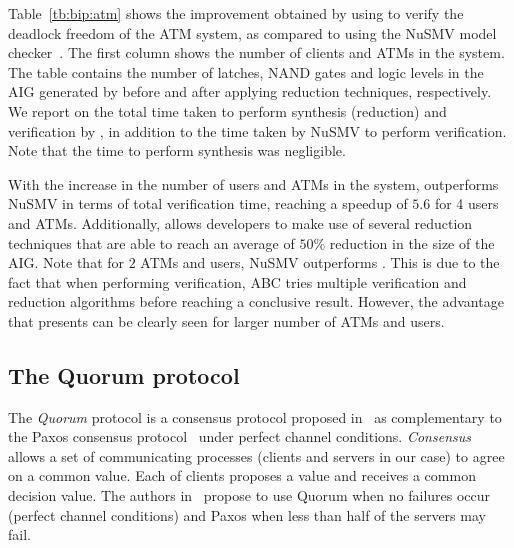 Table~\ref{tb:bip:atm} shows the improvement obtained by using \biptool{}
to verify the deadlock freedom of the ATM system, as compared to using the
NuSMV model checker~\cite{nusmv}.
The first column shows the number of clients and ATMs in the system. 
The table contains the number  of latches, NAND gates and logic levels in the AIG generated by \biptool{} before and after applying reduction techniques, respectively.
We report on the total time taken to perform synthesis (reduction)
and verification by \biptool{}, in addition to the time taken by NuSMV to perform verification.
Note that the time to perform synthesis was negligible. 

With the increase in the number of users and ATMs in the system, \biptool{}  
outperforms NuSMV in terms of total verification time, reaching a speedup 
of $5.6$ for 4 users and ATMs. Additionally, \biptool{} allows developers
to make use of several reduction techniques that are able to reach an 
average of $50\%$ reduction in the size of the AIG. Note that for $2$ ATMs 
and users, NuSMV outperforms \biptool{}. This is due to the fact that when 
performing verification, ABC tries multiple verification and reduction 
algorithms before reaching a conclusive result. However, the advantage 
that \biptool{} presents can be clearly seen for larger number of ATMs and 
users. 
%
\subsection{The Quorum protocol}
\label{subsec:quorum}
%
The \emph{Quorum} protocol is a consensus protocol proposed in~\cite{guerraoui2012speculative}
as complementary to the Paxos consensus protocol~\cite{gafni2003disk} under perfect
channel conditions. {\em Consensus} allows a set of communicating processes
(clients and servers in our case) to agree on a common value. Each of clients proposes
a value and receives a common decision value. The authors in~\cite{guerraoui2012speculative}
propose to use Quorum when no failures occur (perfect channel conditions) and 
Paxos when less than half of the servers may fail. 


